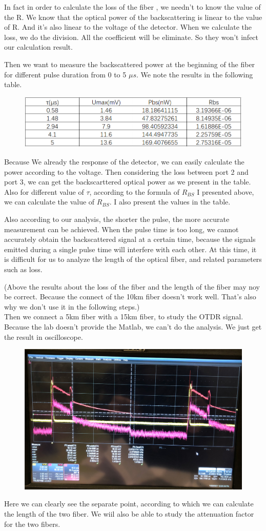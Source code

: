 \documentclass{article}
\begin{document}
	In fact in order to calculate the loss of the fiber , we needn't to know the value of the R. We know that the optical power of the backscattering is linear to the value of R. And it's also linear to the voltage of the detector. When we calculate the loss, we do the division. All the coefficient will be eliminate. So they won't infect our calculation result.
	
	Then we want to measure the backscattered power at the beginning of the fiber for different pulse duration from 0 to 5 $\mu s$. We note the results in the following table.
	
	\begin{figure}[H]
		\centering
		\includegraphics[width=0.7\linewidth]{table2}
		\caption{}
		\label{fig:table2}
	\end{figure}

	Because We already the response of the detector, we can easily calculate the power according to the voltage. Then considering the loss between port 2 and port 3, we can get the backscarttered optical power as we present in the table. Also for different value of $\tau$, according to the formula of $R_{BS}$ I presented above, we can calculate the value of $R_{BS}$. I also present the values in the table.
	
	Also according to our analysis, the shorter the pulse, the more accurate measurement can be achieved. When the pulse time is too long, we cannot accurately obtain the backscattered signal at a certain time, because the signals emitted during a single pulse time will interfere with each other. At this time, it is difficult for us to analyze the length of the optical fiber, and related parameters such as loss.
	
	(Above the results about the loss of the fiber and the length of the fiber may noy be correct. Because the connect of the 10km fiber doesn't work well. That's also why we don't use it in the following steps.)
	\\
	Then we connect a 5km fiber with a 15km fiber, to study the OTDR signal. Because the lab doesn't provide the Matlab, we can't do the analysis. We just get the result in oscilloscope.
	
	\begin{figure}[H]
		\centering
		\includegraphics[width=0.7\linewidth]{"figure 5"}
		\caption{}
		\label{fig:figure-5}
	\end{figure}
	
	Here we can clearly see the separate point, according to which we can calculate the length of the two fiber. We wiil also be able to study the attenuation factor for the two fibers.
\end{document}
